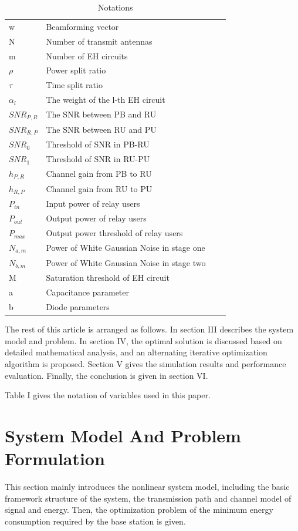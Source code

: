 \documentclass[conference]{IEEEtran}
\begin{document}
\begin{table}[htbp]
\caption{Notations}
\begin{center}
\begin{tabular}{llll}
\hline
w& Beamforming vector\\
N& Number of transmit antennas\\
m& Number of EH circuits\\
$\rho$ & Power split ratio\\
$\tau$ & Time split ratio\\
$\alpha _{l}$ & The weight of the l-th EH circuit\\
$SNR_{P,R}$ & The SNR between PB and RU\\
$SNR_{R,P}$ & The SNR between RU and PU\\
$SNR_{0}$ &  Threshold of SNR in PB-RU\\
$SNR_{1}$ & Threshold of SNR in RU-PU\\
$h_{P,R}$ & Channel gain from PB to RU\\
$h_{R,P}$ &Channel gain from RU to PU\\
$P_{in}$ & Input power of relay users\\
$P_{out}$ & Output power of relay users\\
$P_{max}$ & Output power threshold of relay users\\
$N_{a,m}$ & Power of White Gaussian Noise in stage one\\
$N_{b,m}$ & Power of White Gaussian Noise in stage two\\
M& Saturation threshold of EH circuit\\
a& Capacitance parameter\\
b& Diode parameters\\
\hline
\end{tabular}
\label{tab1}
\end{center}
\end{table}

The rest of this article is arranged as follows. In section III describes the system model and problem. 
In  section IV, the optimal solution is discussed based on detailed mathematical analysis, and an alternating iterative optimization algorithm is proposed. Section V gives the simulation results and performance evaluation. Finally, the conclusion is given in section VI.

Table I gives the notation of variables used in this paper. 

\section{System Model And Problem Formulation}
This section mainly introduces the nonlinear system model, including the basic framework structure of the system, the transmission path and channel model of signal and energy. Then, the optimization problem of the minimum energy consumption required by the base station is given.
\end{document}
